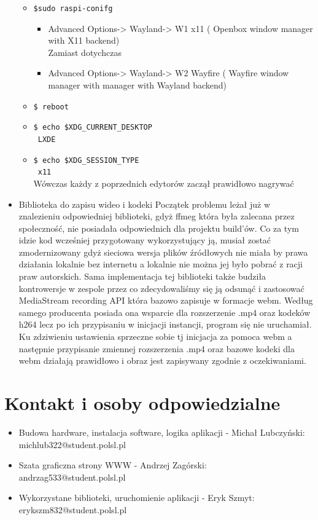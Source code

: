 \documentclass[a4paper,twoside,12pt]{book}
\begin{document}
\begin{itemize}
\begin{itemize}
\item \lstinline|$sudo raspi-conifg|\\
\begin{itemize}
	\item Advanced Options-> Wayland-> W1 x11 ( Openbox window manager with X11 backend)\\
Zamiast dotychczas
	\item Advanced Options-> Wayland-> W2 Wayfire ( Wayfire window manager with manager with Wayland backend)
\end{itemize}
\item \lstinline|$ reboot|
 \item \lstinline|$ echo $XDG_CURRENT_DESKTOP|\\
  \lstinline| LXDE|
 \item \lstinline|$ echo $XDG_SESSION_TYPE |\\
  \lstinline| x11|\\
Wówczas każdy z poprzednich edytorów zaczął prawidłowo nagrywać
\end{itemize}
\item Biblioteka do zapisu wideo i kodeki
Początek problemu leżał już w znalezieniu odpowiedniej biblioteki, gdyż ffmeg która była zalecana przez społeczność, nie posiadała odpowiednich dla projektu build'ów. Co za tym idzie kod wcześniej przygotowany wykorzystujący ją, musiał zostać zmodernizowany gdyż sieciowa wersja plików źródłowych nie miała by prawa działania lokalnie bez internetu a lokalnie nie można jej było pobrać z racji praw autorskich. Sama implementacja tej biblioteki także budziła kontrowersje w zespole przez co zdecydowaliśmy się ją odsunąć i zastosować MediaStream recording API która bazowo zapisuje w formacje webm. Według samego producenta posiada ona wsparcie dla rozszerzenie .mp4 oraz kodeków h264 lecz po ich przypisaniu w inicjacji instancji, program się nie uruchamiał. Ku zdziwieniu ustawienia sprzeczne sobie tj inicjacja za pomoca webm a następnie przypisanie zmiennej rozszerzenia .mp4 oraz bazowe kodeki  dla webm działają prawidłowo i obraz jest zapisywany zgodnie z oczekiwaniami.
\end{itemize}


\section{Kontakt i osoby odpowiedzialne}
\begin{itemize}
\item Budowa hardware, instalacja software, logika aplikacji - Michał Lubczyński: michlub322@student.polsl.pl
\item Szata graficzna strony WWW - Andrzej Zagórski: andrzag533@student.polsl.pl
\item Wykorzystane biblioteki, uruchomienie aplikacji - Eryk Szmyt: erykszm832@student.polsl.pl
\end{itemize}
\end{document}
